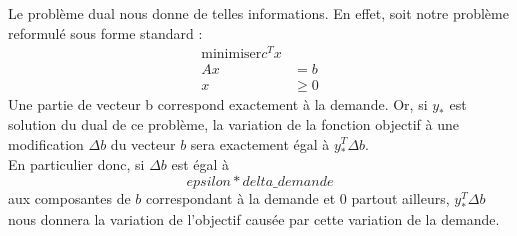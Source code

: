 \documentclass[12pt,oneside,a4paper]{article}
\begin{document}
Le problème dual nous donne de telles informations. En effet, soit notre problème reformulé sous forme standard : \\
\begin{align*} 
	\text{minimiser} c^Tx &\\
	Ax &= b  \\
	x &\geq 0 
\end{align*}
Une partie de vecteur b correspond exactement à la demande.
Or, si $y_{*}$ est solution du dual de ce problème, la variation de la fonction objectif à une modification $\Delta b$ du vecteur $b$ sera exactement égal à $y_{*}^{T}\Delta b$. \\
En particulier donc, si $\Delta b$ est égal à $$epsilon * delta\_demande$$ aux composantes de $b$ correspondant à la demande et 0 partout ailleurs, $y_{*}^{T}\Delta b$ nous donnera la variation de l'objectif causée par cette variation de la demande.
\end{document}
